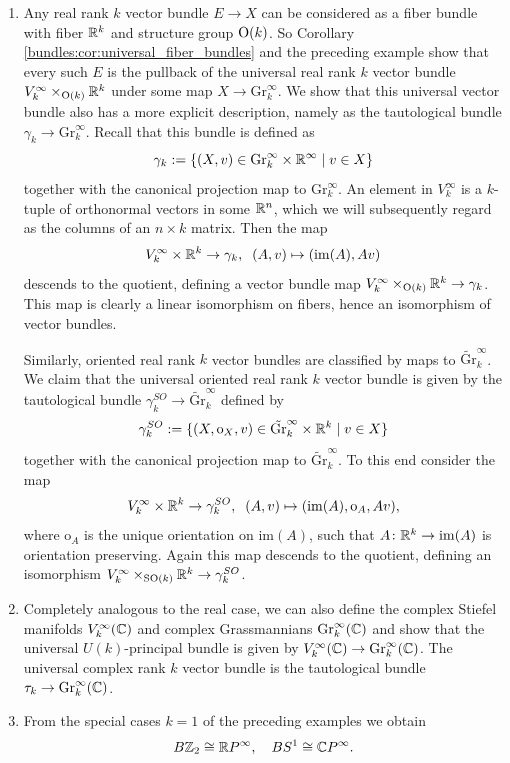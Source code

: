 \begin{example}
\begin{enumerate}[label=(\roman*)]
        \item \label{bundles:ex:examples_for_classifiying_spaces_universal_vector_bundle} Any real rank $k$ vector bundle $E \to X$ can be considered as a fiber bundle with fiber $\mathbb{R}^k$ and structure group $\mathrm{O}(k)$. So Corollary \ref{bundles:cor:universal_fiber_bundles} and the preceding example show that every such $E$ is the pullback of the universal real rank $k$ vector bundle $V_k^\infty \times_{\mathrm{O}(k)} \mathbb{R}^k$ under some map $X \to \mathrm{Gr}_k^\infty$. We show that this universal vector bundle also has a more explicit description, namely as the tautological bundle $\gamma_k \to \mathrm{Gr}_k^\infty$. Recall that this bundle is defined as 
        \[
        \gamma_k := \{(X,v) \in \mathrm{Gr}_k^\infty \times \mathbb{R}^\infty \mid v \in X\}
        \] 
        together with the canonical projection map to $\mathrm{Gr}_k^\infty$. An element in $V_k^\infty$ is a $k$-tuple of orthonormal vectors in some $\mathbb{R}^n$, which we will subsequently regard as the columns of an $n \times k$ matrix. Then the map 
        \[
        V_k^\infty \times \mathbb{R}^k \to \gamma_k, \;\; (A,v) \mapsto (\mathrm{im}(A), Av)
        \]
        descends to the quotient, defining a vector bundle map $V_k^\infty \times_{\mathrm{O}(k)} \mathbb{R}^k \to \gamma_k$. This map is clearly a linear isomorphism on fibers, hence an isomorphism of vector bundles. 

        Similarly, oriented real rank $k$ vector bundles are classified by maps to $\tilde{\mathrm{Gr}}_k^\infty$. We claim that the universal oriented real rank $k$ vector bundle is given by the tautological bundle $\gamma_k^{SO} \to \tilde{\mathrm{Gr}}_k^\infty$ defined by 
        \[
        \gamma_k^{SO} := \{(X,\mathrm{o}_X,v) \in \tilde{\mathrm{Gr}}_k^\infty \times \mathbb{R}^k \mid v \in X\}
        \]
        together with the canonical projection map to $\tilde{\mathrm{Gr}}_k^\infty$. To this end consider the map 
        \[
        V_k^\infty \times \mathbb{R}^k \to \gamma_k^{SO}, \;\; (A,v) \mapsto (\mathrm{im}(A), \mathrm{o}_A, Av),
        \]
        where $\mathrm{o}_A$ is the unique orientation on $\mathrm{im}(A)$, such that $A \colon \mathbb{R}^k \to \mathrm{im}(A)$ is orientation preserving. Again this map descends to the quotient, defining an isomorphism $V_k^\infty \times_{\mathrm{SO}(k)} \mathbb{R}^k \to \gamma_k^{SO}$.
        \item \label{bundles:ex:examples_for_classifiying_spaces_universal_complex_vector_bundle}Completely analogous to the real case, we can also define the complex Stiefel manifolds $V_k^\infty(\mathbb{C})$ and complex Grassmannians $\mathrm{Gr}_k^\infty(\mathbb{C})$ and show that the universal $U(k)$-principal bundle is given by $V_k^\infty(\mathbb{C}) \to \mathrm{Gr}_k^\infty(\mathbb{C})$. The universal complex rank $k$ vector bundle is the tautological bundle $\tau_k \to \mathrm{Gr}_k^\infty(\mathbb{C})$. 
        \item \label{bundles:es:examples_for_classifying_spaces_special_case}From the special cases $k=1$ of the preceding examples we obtain
        \[
        B\mathbb{Z}_2 \cong \mathbb{R} P^\infty, \quad BS^1 \cong \mathbb{C} P^\infty. 
        \]
    \end{enumerate}
\end{example}



